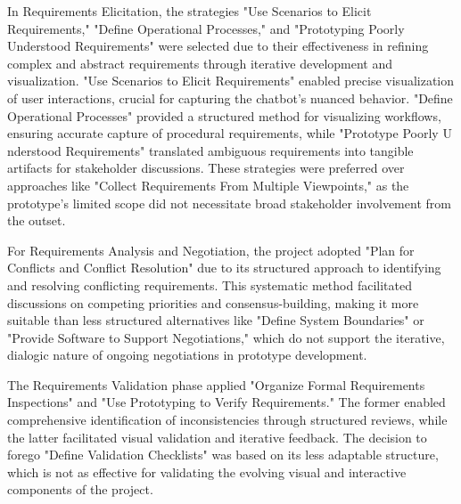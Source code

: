 In Requirements Elicitation, the strategies "Use Scenarios to Elicit Requirements," "Define Operational Processes," and
"Prototyping Poorly Understood Requirements" were selected due to their effectiveness in refining complex and abstract
requirements through iterative development and visualization. "Use Scenarios to Elicit Requirements" enabled precise
visualization of user interactions, crucial for capturing the chatbot’s nuanced behavior.
\autocite[cf.][p.99]{sommervilleRequirementsEngineeringGood1997} "Define Operational Processes" provided a structured
method for visualizing workflows, ensuring accurate capture of procedural requirements, while "Prototype Poorly U
nderstood Requirements" translated ambiguous requirements into tangible artifacts for stakeholder discussions.
\autocite[cf.][p.102--103]{sommervilleRequirementsEngineeringGood1997}
\autocite[cf.][p.94--96]{sommervilleRequirementsEngineeringGood1997} These strategies were preferred over approaches
like "Collect Requirements From Multiple Viewpoints," as the prototype’s limited scope did not necessitate broad
stakeholder involvement from the outset.\autocite[cf.][p.90]{sommervilleRequirementsEngineeringGood1997}

For Requirements Analysis and Negotiation, the project adopted "Plan for Conflicts and Conflict Resolution" due to its
structured approach to identifying and resolving conflicting requirements.
\autocite[cf.][p.125--127]{sommervilleRequirementsEngineeringGood1997} This systematic method facilitated
discussions on competing priorities and consensus-building, making it more suitable than less structured alternatives
like "Define System Boundaries" or "Provide Software to Support Negotiations," which do not support the iterative,
dialogic nature of ongoing negotiations in prototype development.
\autocite[cf.][p.114]{sommervilleRequirementsEngineeringGood1997}
\autocite[cf.][p.121]{sommervilleRequirementsEngineeringGood1997}

The Requirements Validation phase applied "Organize Formal Requirements Inspections" and "Use Prototyping to Verify
Requirements." The former enabled comprehensive identification of inconsistencies through structured reviews, while the
latter facilitated visual validation and iterative feedback.
\autocite[cf.][p.195--196]{sommervilleRequirementsEngineeringGood1997}
\autocite[cf.][p.203--204]{sommervilleRequirementsEngineeringGood1997} The decision to forego "Define Validation
Checklists" was based on its less adaptable structure, which is not as effective for validating the evolving visual and
interactive components of the project.\autocite[cf.][p.200]{sommervilleRequirementsEngineeringGood1997}


